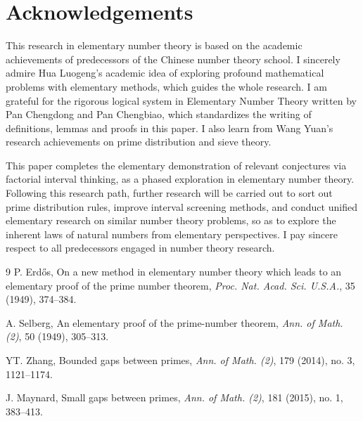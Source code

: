 \documentclass[12pt,letterpaper,reqno]{amsart}
\theoremstyle{plain}
\theoremstyle{definition}
\theoremstyle{remark}
\begin{document}
	\section{Acknowledgements}
	This research in elementary number theory is based on the academic achievements of predecessors of the Chinese number theory school. I sincerely admire Hua Luogeng’s academic idea of exploring profound mathematical problems with elementary methods, which guides the whole research. I am grateful for the rigorous logical system in Elementary Number Theory written by Pan Chengdong and Pan Chengbiao, which standardizes the writing of definitions, lemmas and proofs in this paper. I also learn from Wang Yuan’s research achievements on prime distribution and sieve theory.
	
	This paper completes the elementary demonstration of relevant conjectures via factorial interval thinking, as a phased exploration in elementary number theory. Following this research path, further research will be carried out to sort out prime distribution rules, improve interval screening methods, and conduct unified elementary research on similar number theory problems, so as to explore the inherent laws of natural numbers from elementary perspectives. I pay sincere respect to all predecessors engaged in number theory research.
	\begin{thebibliography}{9}
		P. Erdős, On a new method in elementary number theory which leads to an elementary proof of the prime number theorem, \textit{Proc. Nat. Acad. Sci. U.S.A.}, 35 (1949), 374–384.
		
		A. Selberg, An elementary proof of the prime-number theorem, \textit{Ann. of Math. (2)}, 50 (1949), 305–313.
		
		YT. Zhang, Bounded gaps between primes, \textit{Ann. of Math. (2)}, 179 (2014), no. 3, 1121–1174.
		
		J. Maynard, Small gaps between primes, \textit{Ann. of Math. (2)}, 181 (2015), no. 1, 383–413.
	\end{thebibliography}
	
\end{document}

